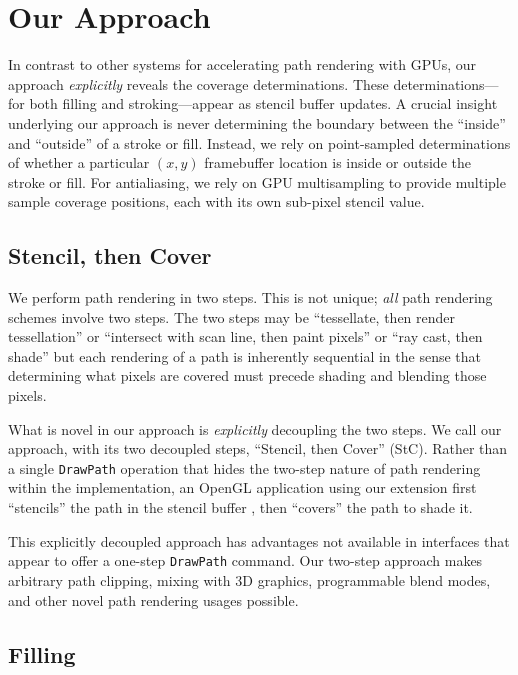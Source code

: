 
\section{Our Approach}
\label{sec:approach}

In contrast to other systems for accelerating path rendering with GPUs,
our approach {\em explicitly} reveals the coverage determinations.  These
determinations---for both filling and stroking---appear as stencil buffer
updates.
A crucial insight underlying our approach is never determining the
boundary between the ``inside'' and ``outside'' of a stroke or fill.
Instead, we rely on point-sampled determinations of whether a particular
$(x,y)$ framebuffer location is inside or outside the stroke or fill.  For antialiasing, we rely on GPU
multisampling to provide multiple sample coverage positions, each with
its own sub-pixel stencil value.

\subsection{Stencil, then Cover}

We perform path rendering in two steps.  This is not unique; {\em all} path
rendering schemes involve two steps.  The two steps may be ``tessellate,
then render tessellation'' \cite{Direct2D} or ``intersect with scan
line, then paint pixels'' \cite{Rejected} or ``ray cast, then shade''
\cite{Nehab:2008:RRG:1457515.1409088} but each rendering of a path is
inherently sequential in the sense that determining what pixels are
covered must precede shading and blending those pixels.

What is novel in our approach is {\em explicitly} decoupling the two
steps.  We call our approach, with its two decoupled steps, ``Stencil, then Cover'' (StC).
Rather than a single {\tt DrawPath} operation that hides the two-step nature
of path rendering within the implementation, an OpenGL application
using our extension first ``stencils'' the path in the stencil buffer
\cite{Kurt:1995:ieeestyle}, then ``covers'' the path to shade it.

This explicitly decoupled approach has advantages not available
in interfaces that appear to offer a one-step {\tt DrawPath} command.
Our two-step approach makes arbitrary path clipping, mixing with 3D
graphics, programmable blend modes, and other novel path rendering usages
possible.

\subsection{Filling}

